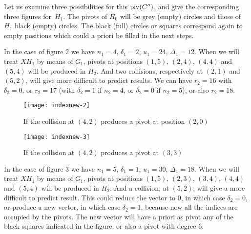 
Let us examine three  possibilities for this $\mathrm{piv}(C'')$, and give the corresponding three figures for~$H_1$.
The pivots of $H_0$ will be grey (empty) circles  and those of $H_1$ black (empty) circles.
The black (full) circles or squares correspond again to empty positions which could  a priori
be filled in the next steps.



In the case of  figure 2 we have  $n_1=4$, $\delta_1=2$, $u_1=24$,
$\Delta_1=12$.
When we will treat  $XH_1$ by means of $G_1$,
 pivots at positions $(1,5)$, $(2,4)$, $(4,4)$ and $(5,4)$
will be produced in  $H_2$. And two collisions, respectively at $(2,1)$ and $(5,2)$, will give  more difficult 
to predict results.
We can have $r_2=16$ with $\delta_2=0$, or  $r_2=17$ (with $\delta_2=1$ if $n_2=4$, or $\delta_2=0$ if $n_2=5$),
or also  $r_2=18$.

\begin{figure}[ht]
%
\begin{center}
\texttt{[image: indexnew-2]}

\caption[figure 2]
{\label{fig2} If the collision at $(4,2)$ produces a pivot at position $(2,0)$ }

\end{center}
\end{figure}
	
\begin{figure}[ht]
%
\begin{center}
\texttt{[image: indexnew-3]}

\caption[figure 3]
{\label{fig3} If the collision at $(4,2)$ produces a pivot at $(3,3)$}

\end{center}
\end{figure}


In the case of figure 3  we have  $n_1=5$, $\delta_1=1$, $u_1=30$, $\Delta_1=18$.
When we will treat $XH_1$ by means of   $G_1$,
 pivots at positions $(1,5)$, $(2,3)$, $(3,4)$, $(4,4)$ and $(5,4)$
will be produced in $H_2$. And a collision, at $(5,2)$, will give a more difficult to predict result.
This could reduce the vector to $0$, in which case $\delta_2=0$, or produce a new  
vector, in which case $\delta_2=1$, because now all the  indices are occupied by the pivots.  The new vector will have a priori as pivot any of the black squares indicated in the figure, or also a
 pivot with degree $6$.

